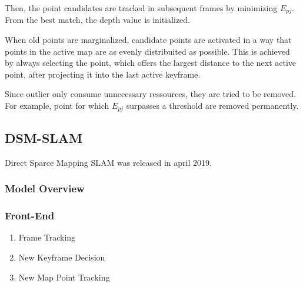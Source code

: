 \begin{enumerate}
	Then, the point candidates are tracked in subsequent frames by minimizing $E_{pj}$. From the best match, the depth value is initialized. 
	
	When old points are marginalized, candidate points are activated in a way that points in the active map are as evenly distribuited 
	as possible. This is achieved by always selecting the point, which offers the largest distance to the next active point, after projecting
	it into the last active keyframe. 
	
	Since outlier only consume unnecessary ressources, they are tried to be removed. For example, point for which $E_{pj}$ surpasses a threshold 
	are removed permanently. 
	
	\end{enumerate}

	\subsection{DSM-SLAM}
	
	Direct Sparce Mapping SLAM was released in april 2019.
	
	\subsubsection{Model Overview}
	\subsubsection{Front-End}
	
	\begin{enumerate}
	\item{Frame Tracking}
	\item{New Keyframe Decision}
	\item{New Map Point Tracking}
	
	\end{enumerate}
 
 